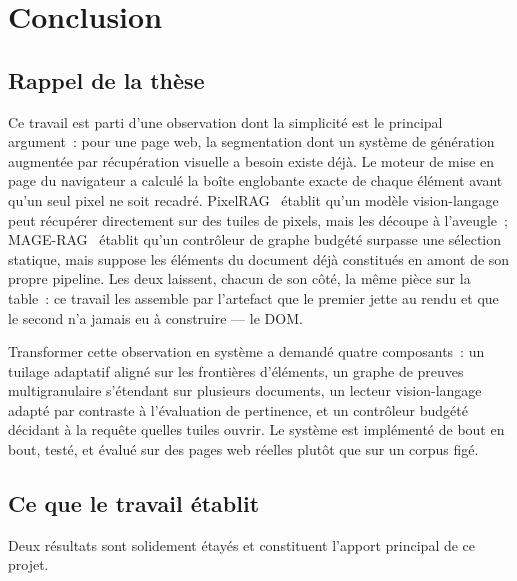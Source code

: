 \chapter*{Conclusion}
\label{chap-conclusion}

\section*{Rappel de la thèse}

Ce travail est parti d'une observation dont la simplicité est le principal
argument~: pour une page web, la segmentation dont un système de génération
augmentée par récupération visuelle a besoin existe déjà. Le moteur de mise en
page du navigateur a calculé la boîte englobante exacte de chaque élément avant
qu'un seul pixel ne soit recadré. PixelRAG~\citep{pixelrag2026} établit qu'un
modèle vision-langage peut récupérer directement sur des tuiles de pixels,
mais les découpe à l'aveugle~; MAGE-RAG~\citep{magerag2026} établit qu'un
contrôleur de graphe budgété surpasse une sélection statique, mais suppose les
éléments du document déjà constitués en amont de son propre pipeline. Les deux
laissent, chacun de son côté, la même pièce sur la table~: ce travail les
assemble par l'artefact que le premier jette au rendu et que le second n'a
jamais eu à construire --- le DOM.

Transformer cette observation en système a demandé quatre composants~: un tuilage
adaptatif aligné sur les frontières d'éléments, un graphe de preuves
multigranulaire s'étendant sur plusieurs documents, un lecteur vision-langage
adapté par contraste à l'évaluation de pertinence, et un contrôleur budgété
décidant à la requête quelles tuiles ouvrir. Le système est implémenté de bout en
bout, testé, et évalué sur des pages web réelles plutôt que sur un corpus figé.

\section*{Ce que le travail établit}

Deux résultats sont solidement étayés et constituent l'apport principal de ce
projet.

